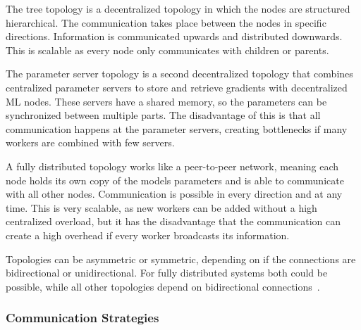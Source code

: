 The tree topology is a decentralized topology in which the nodes are structured hierarchical. The communication takes place between the nodes in specific directions. Information is communicated upwards and distributed downwards. This is scalable as every node only communicates with children or parents.

The parameter server topology is a second decentralized topology that combines centralized parameter servers to store and retrieve gradients with decentralized \ac{ML} nodes. These servers have a shared memory, so the parameters can be synchronized between multiple parts. The disadvantage of this is that all communication happens at the parameter servers, creating bottlenecks if many workers are combined with few servers.

A fully distributed topology works like a peer-to-peer network, meaning each node holds its own copy of the models parameters and is able to communicate with all other nodes. Communication is possible in every direction and at any time. This is very scalable, as new workers can be added without a high centralized overload, but it has the disadvantage that the communication can create a high overhead if every worker broadcasts its information.

Topologies can be asymmetric or symmetric, depending on if the connections are bidirectional or unidirectional. For fully distributed systems both could be possible, while all other topologies depend on bidirectional connections~\cite{won_tacos_2024}.




\subsubsection*{Communication Strategies}

